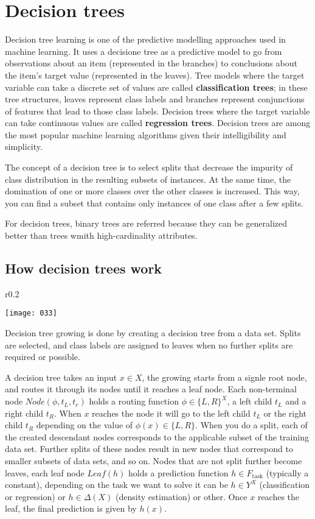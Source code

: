\chapter{Decision trees}

Decision tree learning is one of the predictive modelling approaches used in machine learning. It uses a decisione tree as a predictive model to go from observations about an item (represented in the branches) to conclusions about the item's target value (represented in the leaves). Tree models where the target variable can take a discrete set of values are called \textbf{classification trees}; in these tree structures, leaves represent class labels and branches represent conjunctions of features that lead to those class labels. Decision trees where the target variable can take continuous values are called \textbf{regression trees}. Decision trees are among the most popular machine learning algorithms given their intelligibility and simplicity.

The concept of a decision tree is to select splits that decrease the impurity of class distribution in the resulting subsets of instances. At the same time, the domination of one or more classes over the other classes is increased. This way, you can find a subset that contains only instances of one class after a few splits.

For decision trees, binary trees are referred because they can be generalized better than trees wmith high-cardinality attributes.

\section{How decision trees work}
\begin{wrapfigure}{r}{0.2\textwidth}
\begin{center}
    \texttt{[image: 033]}
    \label{fig:033}
\end{center}
\caption{}
\end{wrapfigure}
Decision tree growing is done by creating a decision tree from a data set. Splits are selected, and class labels are assigned to leaves when no further splits are required or possible.

A decision tree takes an input \(x \in X\), the growing starts from a signle root node, and routes it through its nodes until it reaches a leaf node. Each non-terminal node \(Node(\phi, t_L, t_r)\) holds a routing function \(\phi \in \{L,R\}^X\), a left child \(t_L\) and a right child \(t_R\). When \(x\) reaches the node it will go to the left child \(t_L\) or the right child \(t_R\) depending on the value of \(\phi(x) \in \{L,R\}\). When you do a split, each of the created descendant nodes corresponds to the applicable subset of the training data set. Further splits of these nodes result in new nodes that correspond to smaller subsets of data sets, and so on. Nodes that are not split further become leaves, each leaf node \(Leaf(h)\) holds a prediction function \(h \in F_\text{task}\) (typically a constant), depending on the task we want to solve it can be \(h \in Y^X\) (classification or regression) or \(h \in \Delta(X)\) (density estimation) or other. Once \(x\) reaches the leaf, the final prediction is given by \(h(x)\).

